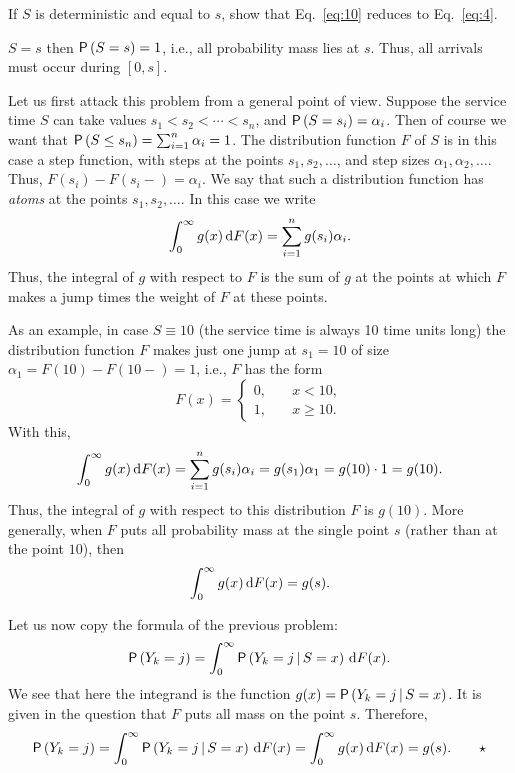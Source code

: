 \begin{exercise}[\faFlask]
  If $S$ is deterministic and equal to $s$, show that
  Eq.~\eqref{eq:10} reduces to Eq.~\eqref{eq:4}.  
  \begin{hint}
 $S=s$ then
    $\P{S=s}=1$, i.e., all probability mass lies at $s$. Thus, all
    arrivals must occur during $[0,s]$.
  \end{hint}
  \begin{solution}
    Let us first attack this problem from a general point of
    view. Suppose the service time $S$ can take values
    $s_1<s_2<\cdots <s_n$, and $\P{S=s_i}=\alpha_i$. Then of course we
    want that $\P{S\leq s_n} = \sum_{i=1}^n \alpha_i = 1$. The
    distribution function $F$ of $S$ is in this case a step function,
    with steps at the points $s_1, s_2, \ldots$, and step sizes
    $\alpha_1, \alpha_2, \ldots$. Thus, $F(s_i)-F(s_i-)=\alpha_i$. We
    say that such a distribution function has \emph{atoms} at the
    points $s_1, s_2, \ldots$. In this case we write
  \begin{equation*}
    \int_0^\infty g(x) \,\text{d}F(x) = \sum_{i=1}^n g(s_i) \alpha_i.
  \end{equation*}
  Thus, the integral of $g$ with respect to $F$ is the sum of $g$ at
  the points at which $F$ makes a jump times the weight of $F$ at
  these points. 

  As an example, in case $S\equiv 10$ (the service time is always 10
  time units long) the distribution function $F$ makes just one jump
  at $s_1=10$ of size $\alpha_1 = F(10)-F(10-) =1$, i.e., $F$ has the
  form
    \begin{equation*}
      F(x) = 
      \begin{cases}
        0, &\quad x< 10, \\
        1, &\quad x\geq 10.
      \end{cases}
    \end{equation*}
With this, 
\begin{equation*}
  \int_0^\infty g(x) \,\text{d}F(x) = \sum_{i=1}^n g(s_i) \alpha_i = g(s_1) \alpha_1 = g(10) \cdot 1 = g(10).
\end{equation*}
Thus, the integral of $g$ with respect to this distribution $F$ is
$g(10)$.  More generally, when $F$ puts all probability mass at the
single point $s$ (rather than at the point $10$), then
\begin{equation*}
  \int_0^\infty g(x) \,\text{d}F(x) = g(s).
\end{equation*}

    Let us now copy the formula of the previous problem:
    \begin{equation*}
    \P{Y_k=j} = \int_0^\infty \P{Y_k =j\given S=x} \d F(x).
    \end{equation*}
    We see that here the integrand is the function
    $g(x) = \P{Y_k=j\given S=x}$. It is given in the question that $F$
    puts all mass on the point $s$. Therefore,
    \begin{equation*}
    \P{Y_k=j} = \int_0^\infty \P{Y_k =j\given S=x} \d F(x) = 
\int_0^\infty g(x) \d F(x) = g(s). \qquad \star
    \end{equation*}


\end{solution}
\end{exercise}
